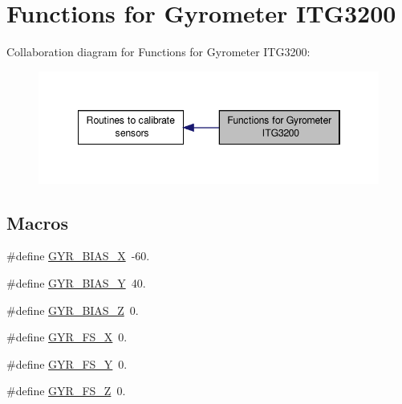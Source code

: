 \hypertarget{group__gyr}{\section{Functions for Gyrometer I\-T\-G3200}
\label{group__gyr}
}
Collaboration diagram for Functions for Gyrometer I\-T\-G3200\-:
\nopagebreak
\begin{figure}[H]
\begin{center}
\leavevmode
\includegraphics[width=346pt]{group__gyr}
\end{center}
\end{figure}
\subsection*{Macros}
\begin{DoxyCompactItemize}
\item 
\#define \hyperlink{group__gyr_ga69780ffe3a15aad4121fed56d5e47377}{G\-Y\-R\-\_\-\-B\-I\-A\-S\-\_\-\-X}~-\/60.
\item 
\#define \hyperlink{group__gyr_gaf3264a08be995ea97ae8581128873877}{G\-Y\-R\-\_\-\-B\-I\-A\-S\-\_\-\-Y}~40.
\item 
\#define \hyperlink{group__gyr_gaa10980bbf5b1dd91704d4dab98fcf991}{G\-Y\-R\-\_\-\-B\-I\-A\-S\-\_\-\-Z}~0.
\item 
\#define \hyperlink{group__gyr_ga8fe84f8c6d39f41d8622fd0cbce3a522}{G\-Y\-R\-\_\-\-F\-S\-\_\-\-X}~0.
\item 
\#define \hyperlink{group__gyr_ga4be2e0fa7596546bb4699862d0fe4183}{G\-Y\-R\-\_\-\-F\-S\-\_\-\-Y}~0.
\item 
\#define \hyperlink{group__gyr_gaaee2ece0c43cc20d7c531ab79dcd06c8}{G\-Y\-R\-\_\-\-F\-S\-\_\-\-Z}~0.
\end{DoxyCompactItemize}
